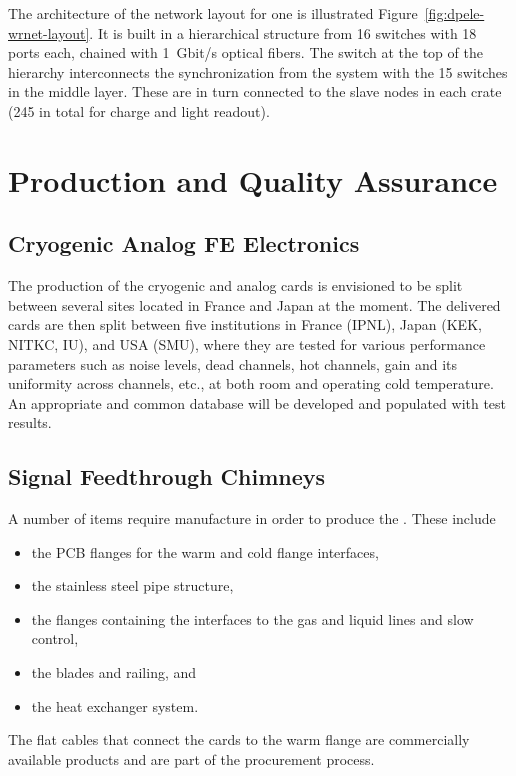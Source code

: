 The architecture of the  network layout for one  is illustrated Figure~\ref{fig:dpele-wrnet-layout}. It is built in a hierarchical structure from \num{16}  switches with \num{18} ports each,  chained with \SI{1}{Gbit/s} optical fibers. The switch at the top of the hierarchy interconnects the synchronization %
 from the  system with the \num{15} switches in the middle layer. These are in turn connected to the  slave nodes in each  crate (\num{245} in total for charge and light readout). 



\section{Production and Quality Assurance}
\label{sec:fddp-tpc-elec-prod-assy}

\subsection{Cryogenic Analog FE Electronics}
\label{sec:fddp-tpc-elec-prod-fe}
The production of the cryogenic  and analog  cards is envisioned to be split between several sites located in France and Japan at the moment. The delivered cards are then split between five institutions in France (IPNL), Japan (KEK, NITKC, IU), and USA (SMU), where they are tested for various performance parameters such as noise levels, dead channels, hot channels, gain and its uniformity across channels, etc., at both room and operating cold temperature. An appropriate and common database will be developed and populated with test results. 

\subsection{Signal Feedthrough Chimneys}
\label{sec:fddp-tpc-elec-prod-sft}
A number of items require manufacture in order to produce the . These include 
\begin{itemize}
\item the PCB flanges for the warm and cold \fdth flange interfaces, 
\item the stainless steel pipe structure, 
\item the flanges containing the interfaces to the gas and liquid lines and slow control, 
\item the blades and railing, and 
\item the heat exchanger system. 
\end{itemize}
The flat cables that connect the  cards to the warm flange are commercially available products and are part of the  procurement process. 

